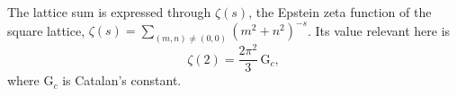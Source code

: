 \documentclass{article}
\begin{document}
The lattice sum is expressed through $\zeta(s)$, the Epstein zeta function of the square lattice,
$\zeta(s) = \sum_{(m,n)\neq(0,0)} (m^2+n^2)^{-s}$. Its value relevant here is
\begin{equation}
\zeta(2) = \frac{2\pi^2}{3}\,\mathrm{G}_{c} ,
\label{eq:e2}
\end{equation}
where $\mathrm{G}_c$ is Catalan's constant.
\end{document}
